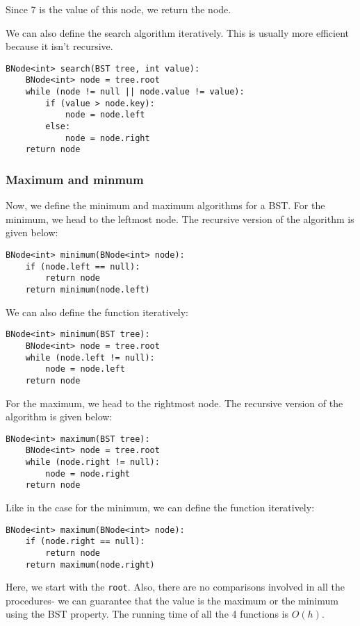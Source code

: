 \documentclass[a4paper, openany]{memoir}
\begin{document}
\begin{center}
\end{center}
Since 7 is the value of this node, we return the node.

\noindent We can also define the search algorithm iteratively. This is usually more efficient because it isn't recursive. 
\begin{lstlisting}[language=pseudocode]
BNode<int> search(BST tree, int value):
    BNode<int> node = tree.root
    while (node != null || node.value != value):
        if (value > node.key):
            node = node.left
        else:
            node = node.right
    return node
\end{lstlisting}

\subsubsection{Maximum and minmum}
Now, we define the minimum and maximum algorithms for a BST. For the minimum, we head to the leftmost node. The recursive version of the algorithm is given below:
\begin{lstlisting}[language=pseudocode]
BNode<int> minimum(BNode<int> node):
    if (node.left == null):
        return node
    return minimum(node.left)
\end{lstlisting}
We can also define the function iteratively:
\begin{lstlisting}[language=pseudocode]
BNode<int> minimum(BST tree):
    BNode<int> node = tree.root
    while (node.left != null):
        node = node.left
    return node
\end{lstlisting}
For the maximum, we head to the rightmost node. The recursive version of the algorithm is given below:
\begin{lstlisting}[language=pseudocode]
BNode<int> maximum(BST tree):
    BNode<int> node = tree.root
    while (node.right != null):
        node = node.right
    return node
\end{lstlisting}
Like in the case for the minimum, we can define the function iteratively:
\begin{lstlisting}[language=pseudocode]
BNode<int> maximum(BNode<int> node):
    if (node.right == null):
        return node
    return maximum(node.right)
\end{lstlisting}
Here, we start with the \texttt{root}. Also, there are no comparisons involved in all the procedures- we can guarantee that the value is the maximum or the minimum using the BST property. The running time of all the 4 functions is $O(h)$.
\end{document}
